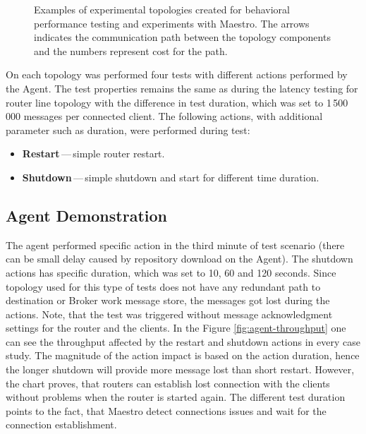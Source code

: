 \begin{figure}[h]
\begin{minipage}{0.45\linewidth}
	\end{minipage}
	\caption[Examples of experimental topologies created for behavioral performance testing and experiments with Maestro.]{Examples of experimental topologies created for behavioral performance testing and experiments with Maestro. The arrows indicates the communication path between the topology components and the numbers represent cost for the path.}\label{fig:agent_topologies}
\end{figure}

On each topology was performed four tests with different actions performed by the Agent. The test properties remains the same as during the latency testing for router line topology with the difference in test duration, which was set to 1\,500\,000 messages per connected client. The following actions, with additional parameter such as duration, were performed during test:

\begin{itemize}
	\setlength\itemsep{0em}
	\item \textbf{Restart}\,---\,simple router restart.
	\item \textbf{Shutdown}\,---\,simple shutdown and start for different time duration.
\end{itemize}

\subsection{Agent Demonstration}
\label{Agent Demonstration}
The agent performed specific action in the third minute of test scenario (there can be small delay caused by repository download on the Agent). The shutdown actions has specific duration, which was set to 10, 60 and 120 seconds. Since topology used for this type of tests does not have any redundant path to destination or Broker work message store, the messages got lost during the actions. Note, that the test was triggered without message acknowledgment settings for the router and the clients. In the Figure \ref{fig:agent-throughput} one can see the throughput affected by the restart and shutdown actions in every case study. The magnitude of the action impact is based on the action duration, hence the longer shutdown will provide more message lost than short restart. However, the chart proves, that routers can establish lost connection with the clients without problems when the router is started again. The different test duration points to the fact, that Maestro detect connections issues and wait for the connection establishment.

